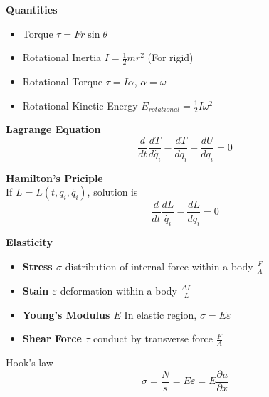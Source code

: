 \documentclass{article}
\begin{document}
\begin{multicols*}{2}
  \noindent\textbf{Quantities}
  \begin{itemize}
  \item Torque $\tau = Fr \sin\theta$
  \item Rotational Inertia $I=\frac{1}{2}mr^2$ (For rigid)
  \item Rotational Torque $\tau = I\alpha$, $\alpha = \dot{\omega}$
  \item Rotational Kinetic Energy $E_{rotational}=\frac{1}{2}I\omega^2$
  \end{itemize}

  \noindent\textbf{Lagrange Equation}
  \begin{equation*}
    \frac{d}{dt}\frac{dT}{d\dot{q_i}} - \frac{dT}{dq_i} + \frac{dU}{dq_i} = 0
  \end{equation*}

  \noindent\textbf{Hamilton's Priciple}\\
  If $L = L(t, q_i, \dot{q_i})$, solution is
  \begin{equation*}
  \frac{d}{dt}\frac{dL}{\dot{q_i}} - \frac{dL}{dq_i} = 0
  \end{equation*}

  \noindent\textbf{Elasticity}
  \begin{itemize}
  \item \textbf{Stress $\sigma$} distribution of internal force within a body $\frac{F}{A}$
  \item \textbf{Stain $\varepsilon$} deformation within a body $\frac{\Delta L}{L}$
  \item \textbf{Young's Modulus $E$} In elastic region, $\sigma = E\varepsilon$
  \item \textbf{Shear Force $\tau$} conduct by transverse force $\frac{F}{A}$
  \end{itemize}
  Hook's law
  \begin{equation*}
    \sigma=\frac{N}{s}=E\varepsilon=E\frac{\partial u}{\partial x}
  \end{equation*}


\end{multicols*}
\end{document}
